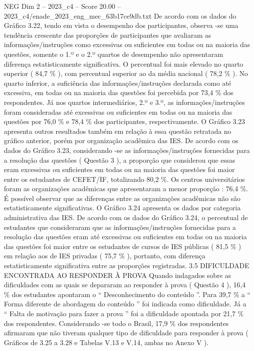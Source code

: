 \begin{textsample}{NEG Dim 2 – 2023\_c4 – Score 20.00 – 2023\_c4/enade\_2023\_eng\_mec\_63b17ce9db.txt}
De acordo com os dados do Gráfico 3.22, tendo em vista o desempenho dos participantes, observa -se uma tendência crescente das proporções de participantes que avaliaram as informações/instruções como excessivas ou suficientes em todas ou na maioria das questões, somente o 1.º e o 2.º quartos de desempenho não apresentaram diferença estatisticamente significativa.
O percentual foi mais elevado no quarto superior ( 84,7 \% ), com percentual superior ao da média nacional ( 78,2 \% ).
No quarto inferior, a suficiência das informações/instruções declarada como até excessiva, em todas ou na maioria das questões foi percebida por 73,4 \% dos respondentes.
Já nos quartos intermediários, 2.º e 3.º, as informações/instruções foram consideradas até excessivas ou suficientes em todas ou na maioria das questões por 76,0 \% e 78,4 \% dos participantes, respectivamente.
O Gráfico 3.23 apresenta outros resultados também em relação à essa questão retratada no gráfico anterior, porém por organização acadêmica das IES.
De acordo com os dados do Gráfico 3.23, considerando -se as informações/instruções fornecidas para a resolução das questões ( Questão 3 ), a proporção que considerou que essas eram excessivas ou suficientes em todas ou na maioria das questões foi maior entre os estudantes de CEFET/IF, totalizando 80,2 \%.
Os centros universitários foram as organizações acadêmicas que apresentaram a menor proporção : 76,4 \%.
É possível observar que as diferenças entre as organizações acadêmicas não são estatisticamente significativas.
O Gráfico 3.24 apresenta os dados por categoria administrativa das IES.
De acordo com os dados do Gráfico 3.24, o percentual de estudantes que consideraram que as informações/instruções fornecidas para a resolução das questões eram até excessivas ou suficientes em todas ou na maioria das questões foi maior entre os estudantes de cursos de IES públicas ( 81,5 \% ) em relação aos de IES privadas ( 75,7 \% ), portanto, com diferença estatisticamente significativa entre as proporções registradas. 3.5 DIFICULDADE ENCONTRADA AO RESPONDER À PROVA Quando indagados sobre as dificuldades com as quais se depararam ao responder à prova ( Questão 4 ), 16,4 \% dos estudantes apontaram o “ Desconhecimento do conteúdo ”.
Para 39,7 \% a “ Forma diferente de abordagem do conteúdo ” foi indicada como dificuldade.
Já a “ Falta de motivação para fazer a prova ” foi a dificuldade apontada por 21,7 \% dos respondentes.
Considerando -se todo o Brasil, 17,9 \% dos respondentes afirmaram que não tiveram qualquer tipo de dificuldade para responder à prova ( Gráficos de 3.25 a 3.28 e Tabelas V.13 e V.14, ambas no Anexo V ).

\end{textsample}
